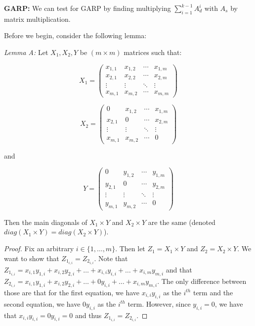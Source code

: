 \documentclass{article} %
\begin{document}
\textbf{GARP:} We can test for GARP by finding multiplying $\sum_{i=1}^{k-1}A_{d}^{i}$ with $A_s$ by matrix multiplication.


Before we begin, consider the following lemma:


\textit{Lemma A:} Let $X_1, X_2, Y$ be $(m\times m)$ matrices such that:

\begin{minipage}{.5\linewidth}
\[
X_1 =
 \begin{pmatrix}
  x_{1,1} & x_{1,2} & \cdots & x_{1,m} \\
  x_{2,1} & x_{2,2} & \cdots & x_{2,m} \\
  \vdots  & \vdots  & \ddots & \vdots  \\
  x_{m,1} & x_{m,2} & \cdots & x_{m,m}
 \end{pmatrix}
\]
\end{minipage}
\begin{minipage}{.5\linewidth}
\[
X_2 =
 \begin{pmatrix}
  0 & x_{1,2} & \cdots & x_{1,m} \\
  x_{2,1} & 0 & \cdots & x_{2,m} \\
  \vdots  & \vdots  & \ddots & \vdots  \\
  x_{m,1} & x_{m,2} & \cdots & 0
 \end{pmatrix}
\]
\end{minipage}
and 

\[
Y =
 \begin{pmatrix}
  0 & y_{1,2} & \cdots & y_{1,m} \\
  y_{2,1} & 0 & \cdots & y_{2,m} \\
  \vdots  & \vdots  & \ddots & \vdots  \\
  y_{m,1} & y_{m,2} & \cdots & 0
 \end{pmatrix}
\]

Then the main diagonals of $X_1\times Y$ and $X_2\times Y$ are the same (denoted $diag(X_1\times Y)=diag(X_2\times Y)$).

\begin{proof}
Fix an arbitrary $i\in\{1,\ldots,m\}$. Then let $Z_1=X_1\times Y$ and $Z_2=X_2\times Y$. We want to show that $Z_{1_{i,i}}=Z_{2_{i,i}}$. Note that $Z_{1_{i,i}}=x_{i,1}y_{1,i}+x_{i,2}y_{2,i}+\ldots+x_{i,i}y_{i,i}+\ldots+x_{i,m}y_{m,i}$ and that $Z_{2_{i,i}}=x_{i,1}y_{1,i}+x_{i,2}y_{2,i}+\ldots+0y_{i,i}+\ldots+x_{i,m}y_{m,i}$. The only difference between those are that for the first equation, we have $x_{i,i}y_{i,i}$ as the $i^{th}$ term and the second equation, we have $0y_{i,i}$ as the $i^{th}$ term. However, since $y_{i,i}=0$, we have that $x_{i,i}y_{i,i}=0y_{i,i}=0$ and thus $Z_{1_{i,i}}=Z_{2_{i,i}}$.
\end{proof}
\end{document}

